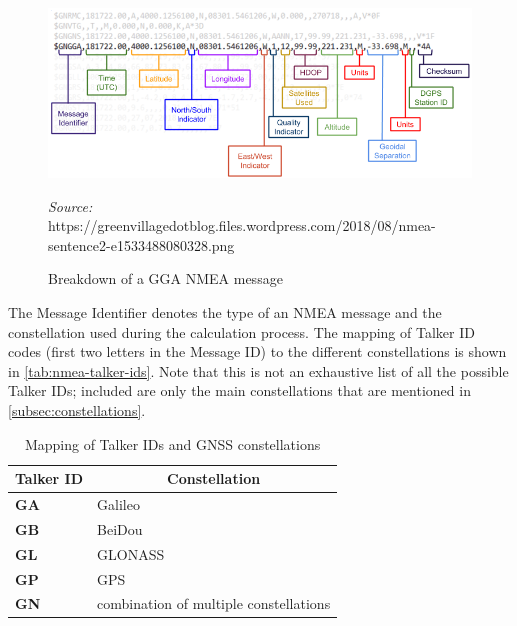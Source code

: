 \documentclass[FM,BP,EN,fonts]{tulthesis}
\begin{document}
\begin{figure}[ht]
    \centering
    \includegraphics[scale=.6]{media/nmea-format.png}
    \caption{Breakdown of a GGA NMEA message}
    \textit{Source:} https://greenvillagedotblog.files.wordpress.com/2018/08/nmea-sentence2-e1533488080328.png
    \label{fig:gga-nmea-breakdown}
\end{figure}

The Message Identifier denotes the type of an NMEA message and the constellation used during the calculation process. The mapping of Talker ID codes (first two letters in the Message ID) to the different constellations is shown in \autoref{tab:nmea-talker-ids}. Note that this is not an exhaustive list of all the possible Talker IDs; included are only the main constellations that are mentioned in \autoref{subsec:constellations}.

\begin{table}[ht]
    \centering
    \begin{tabular}{|l|l|}
        \hline
        \multicolumn{1}{|c|}{Talker ID} & \multicolumn{1}{c|}{Constellation}     \\ \hline
        \textbf{GA}                              & Galileo                                \\ \hline
        \textbf{GB}                              & BeiDou                                 \\ \hline
        \textbf{GL}                              & GLONASS                                \\ \hline
        \textbf{GP}                              & GPS                                    \\ \hline
        \textbf{GN}                              & combination of multiple constellations \\ \hline
    \end{tabular}
    \caption{Mapping of Talker IDs and GNSS constellations}
    \label{tab:nmea-talker-ids}
\end{table}
\end{document}
